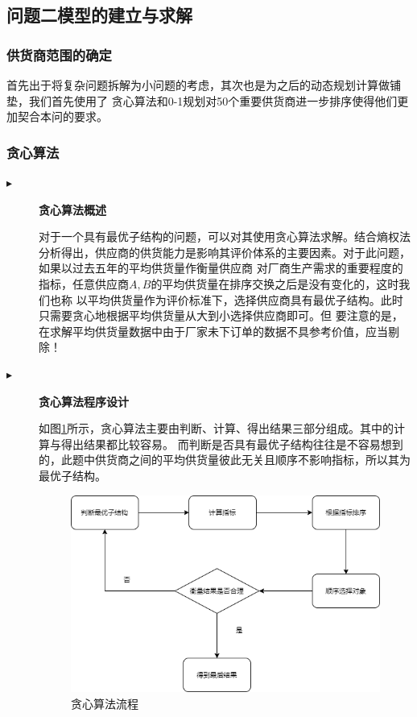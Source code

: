 \documentclass{cumcmthesis}
\begin{document}
\subsection{问题二模型的建立与求解}
\subsubsection{供货商范围的确定}
首先出于将复杂问题拆解为小问题的考虑，其次也是为之后的动态规划计算做铺垫，我们首先使用了
贪心算法和0-1规划对50个重要供货商进一步排序使得他们更加契合本问的要求。
\subsubsection*{贪心算法}
\begin{description}
    \item[$\blacktriangleright$] \textbf{贪心算法概述}\par
        对于一个具有最优子结构的问题，可以对其使用贪心算法求解。结合熵权法分析得出，供应商的供货能力是影响其评价体系的主要因素。对于此问题，如果以过去五年的平均供货量作衡量供应商
        对厂商生产需求的重要程度的指标，任意供应商$A,B$的平均供货量在排序交换之后是没有变化的，这时我们也称
        以平均供货量作为评价标准下，选择供应商具有最优子结构。此时只需要贪心地根据平均供货量从大到小选择供应商即可。但
        要注意的是，在求解平均供货量数据中由于厂家未下订单的数据不具参考价值，应当剔除！
    \item[$\blacktriangleright$] \textbf{贪心算法程序设计}\par
        如图\ref{fig:4}所示，贪心算法主要由判断、计算、得出结果三部分组成。其中的计算与得出结果都比较容易。
        而判断是否具有最优子结构往往是不容易想到的，此题中供货商之间的平均供货量彼此无关且顺序不影响指标，所以其为最优子结构。
        \begin{figure}[H]
            \centering
            \includegraphics[scale = 0.6]{test.png}
            \centering
            \caption{贪心算法流程} \label{fig:4}
        \end{figure}
\end{description}
\end{document}
